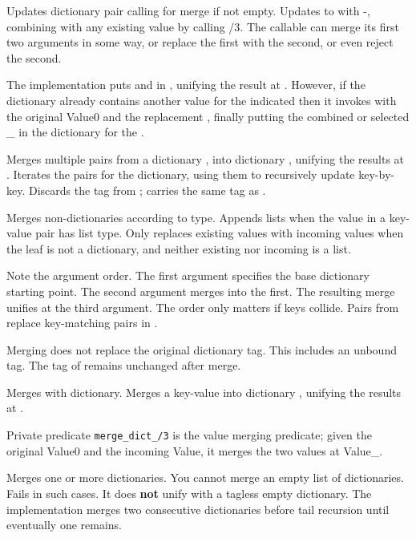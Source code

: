 \begin{description}
Updates dictionary pair calling for merge if not empty. Updates
 to  with -, combining  with any existing
value by calling /3. The callable can merge its first two
arguments in some way, or replace the first with the second, or even
reject the second.

The implementation puts  and  in , unifying the result
at . However, if the dictionary  already contains another
value for the indicated  then it invokes  with the
original Value0 and the replacement , finally putting the
combined or selected _ in the dictionary for the .

Merges multiple pairs from a dictionary , into dictionary
, unifying the results at . Iterates the pairs for the
 dictionary, using them to recursively update  key-by-key.
Discards the tag from ;  carries the same tag as .

Merges non-dictionaries according to type. Appends lists when the
value in a key-value pair has list type. Only replaces existing
values with incoming values when the leaf is not a dictionary, and
neither existing nor incoming is a list.

Note the argument order. The first argument specifies the base
dictionary starting point. The second argument merges into the
first. The resulting merge unifies at the third argument. The order
only matters if keys collide. Pairs from  replace key-matching
pairs in .

Merging does not replace the original dictionary tag. This includes
an unbound tag. The tag of  remains unchanged after merge.

Merges  with dictionary. Merges a key-value  into dictionary
, unifying the results at .

Private predicate \verb$merge_dict_/3$
is the value merging predicate; given the original Value0 and the
incoming Value, it merges the two values at Value_.

Merges one or more dictionaries. You cannot merge an empty list of
dictionaries. Fails in such cases. It does \textbf{not} unify  with a
tagless empty dictionary. The implementation merges two consecutive
dictionaries before tail recursion until eventually one remains.


\end{description}
